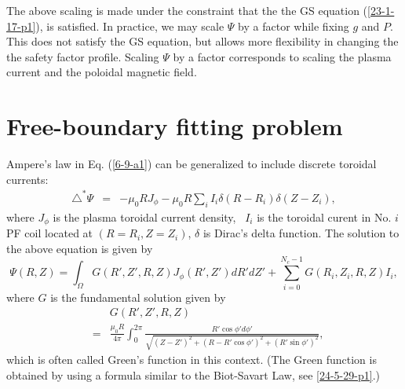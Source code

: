 \documentclass{llncs}
\begin{document}
The above scaling is made under the constraint that the the GS equation
(\ref{23-1-17-p1}), is satisfied. In practice, we may scale $\Psi$ by a factor
while fixing $g$ and $P$. This does not satisfy the GS equation, but allows
more flexibility in changing the the safety factor profile. Scaling $\Psi$ by
a factor corresponds to scaling the plasma current and the poloidal magnetic
field.

\section{Free-boundary fitting problem}\label{24-7-5-p1}

Ampere's law in Eq. (\ref{6-9-a1}) can be generalized to include discrete
toroidal currents:
\begin{eqnarray}
  \triangle^{\ast} \Psi & = & - \mu_0 R J_{\phi} - \mu_0 R \sum_i I_i \delta
  (R - R_i) \delta (Z - Z_i), 
\end{eqnarray}
where $J_{\phi}$ is the plasma toroidal current density, \ $I_i$ is the
toroidal curent in No. $i$ PF coil located at $(R = R_i, Z = Z_i)$, $\delta$
is Dirac's delta function. The solution to the above equation is given by
\begin{equation}
  \label{10-31-1} \Psi (R, Z) = \int_{\Omega} G (R', Z', R, Z) J_{\phi} (R',
  Z') d R' d Z' + \sum_{i = 0}^{N_c - 1} G (R_i, Z_i, R, Z) I_i,
\end{equation}
where $G$ is the fundamental solution given by
\begin{eqnarray}
  &  & G (R', Z', R, Z) \nonumber\\
  & = & \frac{\mu_0 R}{4 \pi} \int_0^{2 \pi} \frac{R' \cos \phi' d
  \phi'}{\sqrt{(Z - Z')^2 + (R - R' \cos \phi')^2 + (R' \sin \phi')^2}}, 
  \label{24-5-29-p2}
\end{eqnarray}
which is often called Green's function in this context. (The Green function is
obtained by using a formula similar to the Biot-Savart Law, see
\ref{24-5-29-p1}.)
\end{document}
